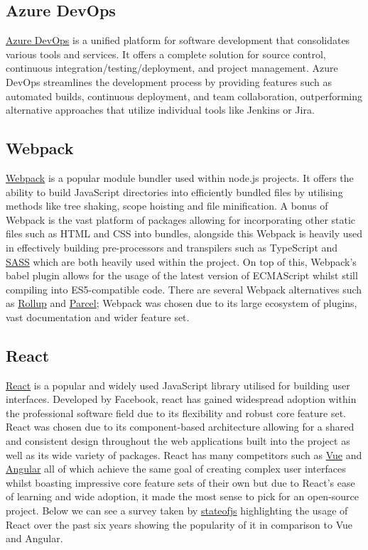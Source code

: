 \documentclass{l4proj}
\begin{document}
\subsection{Azure DevOps}
 \href{https://azure.microsoft.com/en-us/products/devops}{Azure DevOps} \text is a unified platform for software development that consolidates various tools and services. It offers a complete solution for source control, continuous integration/testing/deployment, and project management. Azure DevOps streamlines the development process by providing features such as automated builds, continuous deployment, and team collaboration, outperforming alternative approaches that utilize individual tools like Jenkins or Jira.

\subsection{Webpack}
\href{https://webpack.js.org/}{Webpack} \text is a popular module bundler used within node.js projects. It offers the ability to build JavaScript directories into efficiently bundled files by utilising methods like tree shaking, scope hoisting and file minification. A bonus of Webpack is the vast platform of packages allowing for incorporating other static files such as HTML and CSS into bundles, alongside this Webpack is heavily used in effectively building pre-processors and transpilers such as TypeScript and \href{https://sass-lang.com/}{SASS} which are both heavily used within the project. On top of this, Webpack's babel plugin allows for the usage of the latest version of ECMAScript whilst still compiling into ES5-compatible code. There are several Webpack alternatives such as \href{https://rollupjs.org/}{Rollup} and \href{https://parceljs.org/}{Parcel}; Webpack was chosen due to its large ecosystem of plugins, vast documentation and wider feature set. 

\subsection{React}

 \href{https://reactjs.org/}{React} \text is a popular and widely used JavaScript library utilised for building user interfaces. Developed by Facebook, react has gained widespread adoption within the professional software field due to its flexibility and robust core feature set. React was chosen due to its component-based architecture allowing for a shared and consistent design throughout the web applications built into the project as well as its wide variety of packages. React has many competitors such as \href{https://vuejs.org/}{Vue} and \href{https://angular.io/}{Angular} all of which achieve the same goal of creating complex user interfaces whilst boasting impressive core feature sets of their own but due to React's ease of learning and wide adoption, it made the most sense to pick for an open-source project. Below we can see a survey taken by \href{https://2022.stateofjs.com/en-US/libraries/front-end-frameworks/}{stateofjs} highlighting the usage of React over the past six years showing the popularity of it in comparison to Vue and Angular.
\end{document}
